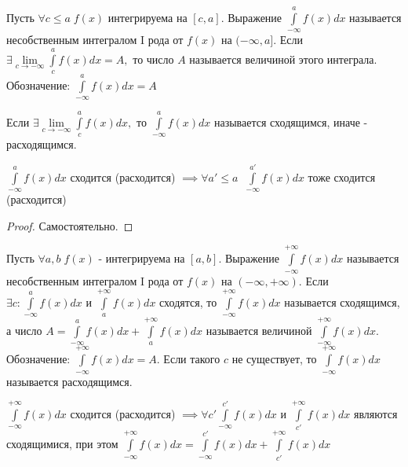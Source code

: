 \documentclass[../main.tex]{subfiles}
\begin{document}
\begin{definition}
    Пусть $\forall c\leqslant a\; f(x)$ интегрируема на $[c,a]$. Выражение $\int\limits_{-\infty  }^{a} f(x)dx$ называется несобственным интегралом I рода от $f(x)$ на $(-\infty,a]$. Если $\exists \lim\limits_{c\to -\infty}\int\limits_{c}^{a}f(x)dx=A,$ то число $A$ называется величиной этого интеграла. Обозначение: $\int\limits_{-\infty}^{a}f(x)dx=A$
\end{definition}
\begin{definition}
    Если $\exists \lim\limits_{c\to -\infty}\int\limits_{c}^{a}f(x)dx,$ то $\int\limits_{-\infty}^{a}f(x)dx$ называется сходящимся, иначе - расходящимся.
\end{definition}
\begin{theorem}
    $\int\limits_{-\infty   }^{a}f(x)dx  $ сходится (расходится) $\implies \forall a'\leqslant a \;\; \int\limits_{-\infty}^{a'} f(x)dx  $ тоже сходится (расходится)
\end{theorem}
\begin{proof}
    Самостоятельно.
\end{proof}

\begin{definition}
        Пусть $ \forall a,b\; f(x)$ - интегрируема на $[a,b]$. Выражение $\int\limits_{-\infty}^{+\infty}f(x)dx $ называется несобственным интегралом I рода от $f(x)$ на $(-\infty,+\infty)$. Если $\exists c: \int\limits_{-\infty   }^{a}f(x)dx $ и $\int\limits_{a    }^{+\infty}f(x)dx $ сходятся, то $\int\limits_{-\infty}^{+\infty}f(x)dx $ называется сходящимся, а число $A=\int\limits_{-\infty}^{a}f(x)dx + \int\limits_{a }^{+\infty}f(x)dx $ называется величиной $\int\limits_{-\infty}^{+\infty}f(x)dx.$ Обозначение: $\int\limits_{-\infty }^{+\infty  } f(x)dx = A$. Если такого $c$ не существует, то $\int\limits_{-\infty}^{+\infty}f(x)dx  $ называется расходящимся.
\end{definition}
\begin{theorem}
    $\int\limits_{-\infty}^{+\infty}f(x)dx $ сходится (расходится) $\implies \forall c' \int\limits_{-\infty}^{c'}f(x)dx $ и $\int\limits_{c'}^{+\infty}f(x)dx $ являются сходящимися, при этом $\int\limits_{-\infty    }^{+\infty  } f(x)dx=\int\limits_{-\infty   }^{c'}  f(x)dx+\int\limits_{c'}^{+\infty}f(x)dx $
\end{theorem}
\end{document}
